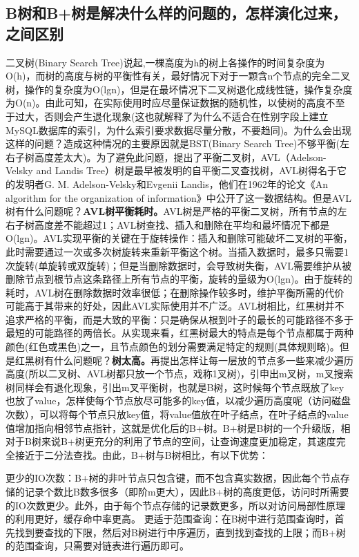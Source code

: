 \documentclass[../../../interview-questions.tex]{subfiles}
\begin{document}
\subsection{B树和B+树是解决什么样的问题的，怎样演化过来，之间区别}

二叉树(Binary Search Tree)说起,一棵高度为h的树上各操作的时间复杂度为O(h)，而树的高度与树的平衡性有关，最好情况下对于一颗含n个节点的完全二叉树，操作的复杂度为O(lgn)，但是在最坏情况下二叉树退化成线性链，操作复杂度为O(n)。由此可知，在实际使用时应尽量保证数据的随机性，以使树的高度不至于过大，否则会产生退化现象(这也就解释了为什么不适合在性别字段上建立MySQL数据库的索引，为什么索引要求数据尽量分散，不要趋同)。为什么会出现这样的问题？造成这种情况的主要原因就是BST(Binary Search Tree)不够平衡(左右子树高度差太大)。为了避免此问题，提出了平衡二叉树，AVL（Adelson-Velsky and Landis Tree）树是最早被发明的自平衡二叉查找树，AVL树得名于它的发明者G. M. Adelson-Velsky和Evgenii Landis，他们在1962年的论文《An algorithm for the organization of information》中公开了这一数据结构。但是AVL树有什么问题呢？\textbf{AVL树平衡耗时。}AVL树是严格的平衡二叉树，所有节点的左右子树高度差不能超过1；AVL树查找、插入和删除在平均和最坏情况下都是O(lgn)。AVL实现平衡的关键在于旋转操作：插入和删除可能破坏二叉树的平衡，此时需要通过一次或多次树旋转来重新平衡这个树。当插入数据时，最多只需要1次旋转(单旋转或双旋转)；但是当删除数据时，会导致树失衡，AVL需要维护从被删除节点到根节点这条路径上所有节点的平衡，旋转的量级为O(lgn)。由于旋转的耗时，AVL树在删除数据时效率很低；在删除操作较多时，维护平衡所需的代价可能高于其带来的好处，因此AVL实际使用并不广泛。AVL树相比，红黑树并不追求严格的平衡，而是大致的平衡：只是确保从根到叶子的最长的可能路径不多于最短的可能路径的两倍长。从实现来看，红黑树最大的特点是每个节点都属于两种颜色(红色或黑色)之一，且节点颜色的划分需要满足特定的规则(具体规则略)。但是红黑树有什么问题呢？\textbf{树太高。}再提出怎样让每一层放的节点多一些来减少遍历高度(所以二叉树、AVL树都只放一个节点，戏称1叉树)，引申出m叉树，m叉搜索树同样会有退化现象，引出m叉平衡树，也就是B树，这时候每个节点既放了key也放了value，怎样使每个节点放尽可能多的key值，以减少遍历高度呢（访问磁盘次数），可以将每个节点只放key值，将value值放在叶子结点，在叶子结点的value值增加指向相邻节点指针，这就是优化后的B+树。B+树是B树的一个升级版，相对于B树来说B+树更充分的利用了节点的空间，让查询速度更加稳定，其速度完全接近于二分法查找。由此，B+树与B树相比，有以下优势：

更少的IO次数：B+树的非叶节点只包含键，而不包含真实数据，因此每个节点存储的记录个数比B数多很多（即阶m更大），因此B+树的高度更低，访问时所需要的IO次数更少。此外，由于每个节点存储的记录数更多，所以对访问局部性原理的利用更好，缓存命中率更高。
更适于范围查询：在B树中进行范围查询时，首先找到要查找的下限，然后对B树进行中序遍历，直到找到查找的上限；而B+树的范围查询，只需要对链表进行遍历即可。
\end{document}
